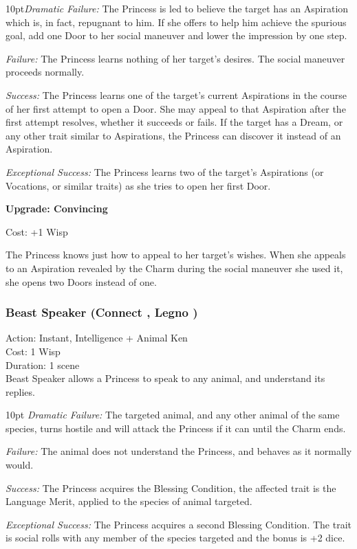 \begin{myindentpar}{10pt}\emph{Dramatic Failure:}  The Princess is led to believe the target has an Aspiration which is, in fact, repugnant to him. If she offers to help him achieve the spurious goal, add one Door to her social maneuver and lower the impression by one step.
 
\emph{Failure:} The Princess learns nothing of her target’s desires. The social maneuver proceeds normally.

\emph{Success:} The Princess learns one of the target’s current Aspirations in the course of her first attempt to open a Door. She may appeal to that Aspiration after the first attempt resolves, whether it succeeds or fails. If the target has a Dream, or any other trait similar to Aspirations, the Princess can discover it instead of an Aspiration.

\emph{Exceptional Success:} The Princess learns two of the target’s Aspirations (or Vocations, or similar traits) as she tries to open her first Door.

\textbf{Upgrade: Convincing}

\noindent Cost: +1 Wisp

The Princess knows just how to appeal to her target’s wishes. When she appeals to an Aspiration revealed by the Charm during the social maneuver she used it, she opens two Doors instead of one.
\end{myindentpar}

\subsubsection*{Beast Speaker (Connect \textbullet\textbullet, Legno \textbullet)}

\noindent Action: Instant, Intelligence + Animal Ken\\

\noindent Cost: 1 Wisp\\

\noindent Duration: 1 scene \\

\noindent Beast Speaker allows a Princess to speak to any animal, and understand its replies.

\begin{myindentpar}{10pt}    \emph{Dramatic Failure:} The targeted animal, and any other animal of the same species, turns hostile and will attack the Princess if it can until the Charm ends.

    \emph{Failure:} The animal does not understand the Princess, and behaves as it normally would.

    \emph{Success:} The Princess acquires the Blessing Condition, the affected trait is the Language Merit, applied to the species of animal targeted. 

    \emph{Exceptional Success:} The Princess acquires a second Blessing Condition. The trait is social rolls with any member of the species targeted and the bonus is +2 dice. \end{myindentpar}
    
